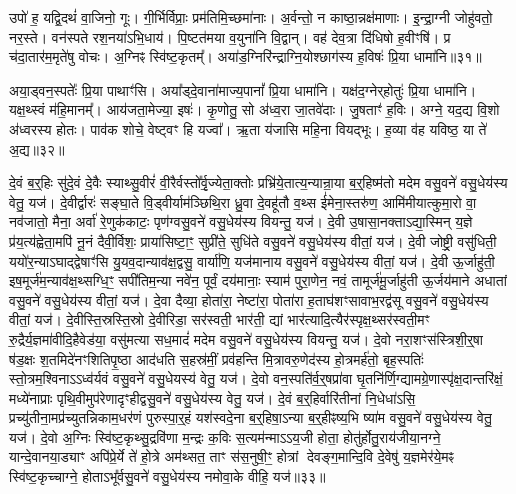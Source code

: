 उपो॑ ह॒ यद्वि॒दथं॑ वा॒जिनो॒ गूः।
गी॒र्भिर्विप्राः॒ प्रम॑तिमि॒च्छमा॑नाः।
अ॒र्वन्तो॒ न काष्ठा॒न्नक्ष॑माणाः।
इ॒न्द्रा॒ग्नी जोहु॑वतो॒ नर॒स्ते।
वन॑स्पते रश॒नया॑\-ऽभि॒धाय॑।
पि॒ष्टत॑मया व॒युना॑नि वि॒द्वान्।
वह॑ देव॒त्रा दि॑धिषो ह॒वीꣳषि॑।
प्र च॑दा॒तार॑म॒मृते॑षु वोचः।
अ॒ग्निꣴ स्वि॑ष्ट॒कृतम्᳚।
अया॑ड॒ग्निरि॑न्द्राग्नि॒योश्छाग॑स्य ह॒विषः॑ प्रि॒या धामा॑नि॥३१॥\ip

अया॒ड्वन॒स्पतेः᳚ प्रि॒या पाथाꣳ॑सि।
अया᳚ड्दे॒वाना॑माज्य॒पानां᳚ प्रि॒या धामा॑नि।
यक्ष॑द॒ग्नेर्‌\mbox{}होतुः॑ प्रि॒या धामा॑नि।
यक्ष॒थ्स्वं म॑हि॒मानम्᳚।
आय॑जता॒मेज्या॒ इषः॑।
कृ॒णोतु॒ सो अ॑ध्व॒रा जा॒तवे॑दाः।
जु॒षताꣳ॑ ह॒विः।
अग्ने॒ यद॒द्य वि॒शो अ॑ध्वरस्य होतः।
पाव॑क शोचे॒ वेष्ट्वꣳ हि यज्वा᳚।
ऋ॒ता य॑जासि महि॒ना वियद्भूः।
ह॒व्या व॑ह यविष्ठ॒ या ते॑ अ॒द्य॥३२॥\ip\anuvakamend[धामा॑नि॒ भूरेकं॑ च]

दे॒वं ब॒र्॒हिः सु॑दे॒वं दे॒वैः स्याथ्सु॒वीरं॑ वी॒रैर्वस्तो᳚र्वृ॒ज्येता॒क्तोः प्रभ्रि॑ये॒तात्य॒न्यान्रा॒या ब॒र्॒हिष्म॑तो मदेम वसु॒वने॑ वसु॒धेय॑स्य वेतु॒ यज॑।
दे॒वीर्द्वारः॑ सङ्घा॒ते वि॒ड्वीर्याम॑ञ्छिथि॒रा ध्रु॒वा दे॒वहू॑तौ व॒थ्स ई॑मेना॒स्तरु॑ण॒ आमि॑मीयात्कुमा॒रो वा॒ नव॑जातो॒ मैना॒ अर्वा॑ रे॒णुक॑काटः॒ पृण॑ग्वसु॒वने॑ वसु॒धेय॑स्य वियन्तु॒ यज॑।
दे॒वी उ॒षासा॒नक्ता\-ऽद्या॒स्मिन्‌ य॒ज्ञे प्र॑य॒त्य॑ह्वेता॒मपि॑ नू॒नं दैवी॒र्विशः॒ प्राया॑सिष्टा॒ꣳ॒ सुप्री॑ते॒ सुधि॑ते वसु॒वने॑ वसु॒धेय॑स्य वीतां॒ यज॑।
दे॒वी जोष्ट्री॒ वसु॑धिती॒ ययो॑र॒न्या\-ऽघाद्द्वेषाꣳ॑सि यु॒यव॒दान्याव॑क्ष॒द्वसु॒ वार्या॑णि॒ यज॑मानाय वसु॒वने॑ वसु॒धेय॑स्य वीतां॒ यज॑।
दे॒वी ऊ॒र्जाहु॑ती॒ इष॒मूर्ज॑म॒न्याव॑क्ष॒थ्सग्धि॒ꣳ॒ सपी॑तिम॒न्या नवे॑न॒ पूर्वं॒ दय॑मानाः॒ स्याम॑ पुरा॒णेन॒ नवं॒ तामूर्ज॑मू॒र्जाहु॑ती ऊ॒र्जय॑माने अधातां वसु॒वने॑ वसु॒धेय॑स्य वीतां॒ यज॑।
दे॒वा दैव्या॒ होता॑रा॒ नेष्टा॑रा॒ पोता॑रा ह॒ताघ॑शꣳसावाभ॒रद्व॑सू वसु॒वने॑ वसु॒धेय॑स्य वीतां॒ यज॑।
दे॒वीस्ति॒स्रस्ति॒स्रो दे॒वीरिडा॒ सर॑स्वती॒ भार॑ती॒ द्यां भार॑त्यादि॒त्यैर॑स्पृक्ष॒थ्सर॑स्वती॒मꣳ रु॒द्रैर्य॒ज्ञमा॑वीदि॒हैवेड॑या॒ वसु॑मत्या सध॒मादं॑ मदेम वसु॒वने॑ वसु॒धेय॑स्य वियन्तु॒ यज॑।
दे॒वो नरा॒शꣳस॑स्त्रिशी॒र्॒षा ष॑ड॒क्षः श॒तमिदे॑नꣳशितिपृ॒ष्ठा आद॑धति स॒हस्र॑मीं॒ प्रव॑हन्ति मि॒त्रावरु॒णेद॑स्य हो॒त्रमर्\mbox{}ह॑तो॒ बृह॒स्पतिः॑ स्तो॒त्रम॒श्विना\-ऽऽध्व॑र्यवं वसु॒वने॑ वसु॒धेयस्य॑ वेतु॒ यज॑।
दे॒वो वन॒स्पति॑र्व॒र्॒षप्रा॑वा घृ॒तनि॑र्णि॒ग्द्यामग्रे॒णास्पृ॑क्ष॒दान्तरि॑क्षं॒ मध्ये॑नाप्राः पृथि॒वीमुप॑रेणादृꣳहीद्वसु॒वने॑ वसु॒धेय॑स्य वेतु॒ यज॑।
दे॒वं ब॒र्॒हिर्वारि॑तीनां नि॒धेधा॑ऽसि॒ प्रच्यु॑तीना॒मप्र॑\-च्युतन्निकाम॒धर॑णं पुरुस्पा॒र्॒हं यश॑स्वदे॒ना ब॒र्॒हिषा॒\-ऽन्या ब॒र्॒हीꣴष्य॒भि ष्या॑म वसु॒वने॑ वसु॒धेय॑स्य वेतु॒ यज॑।
दे॒वो अ॒ग्निः स्वि॑ष्ट॒कृथ्सु॒द्रवि॑णा म॒न्द्रः क॒विः स॒त्यम॑न्मा\-ऽऽय॒जी होता॒ होतु॑र्\mbox{}होतु॒राय॑जीया॒नग्ने॒ यान्दे॒वानया॒ड्याꣳ अपि॑प्रे॒र्ये ते॑ हो॒त्रे अम॑थ्सत॒ ताꣳ स॑स॒नुषी॒ꣳ॒ होत्रां देवङ्ग॒मान्दि॒वि दे॒वेषु॑ य॒ज्ञमेर॑ये॒मꣴ स्वि॑ष्ट॒कृच्चाग्ने॒ होता\-ऽभू᳚र्वसु॒वने॑ वसु॒धेय॑स्य नमोवा॒के वीहि॒ यज॑॥३३॥\ip\anuvakamend[यजैकं॑ च]


